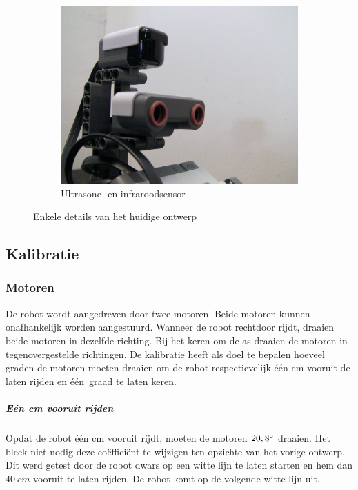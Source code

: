 \documentclass[eind]{penoverslag}
\begin{document}
\begin{figure}
\begin{subfigure}[h]{0.325\textwidth}
		\includegraphics[width=\textwidth]{robotSensoren}
		\caption{Ultrasone- en infraroodsensor}
	\end{subfigure}
\caption{Enkele details van het huidige ontwerp}
\label{fig:robotDetail}
\end{figure}

\subsection{Kalibratie}
\label{ssec:Kalib}

\subsubsection{Motoren}
De robot wordt aangedreven door twee motoren. Beide motoren kunnen onafhankelijk worden aangestuurd. Wanneer de robot rechtdoor rijdt, draaien beide motoren in dezelfde richting. Bij het keren om de as draaien de motoren in tegenovergestelde richtingen. De kalibratie heeft als doel te bepalen hoeveel graden de motoren moeten draaien om de robot respectievelijk \'e\'en cm vooruit de laten rijden en \'e\'en~graad te laten keren.

\subparagraph{E\'en cm vooruit rijden}
Opdat de robot \'e\'en cm vooruit rijdt, moeten de motoren $20,8\degree$ draaien. Het bleek niet nodig deze co\"effici\"ent te wijzigen ten opzichte van het vorige ontwerp. Dit werd getest door de robot dwars op een witte lijn te laten starten en hem dan $40~cm$ vooruit te laten rijden. De robot komt op de volgende witte lijn uit.
\end{document}
